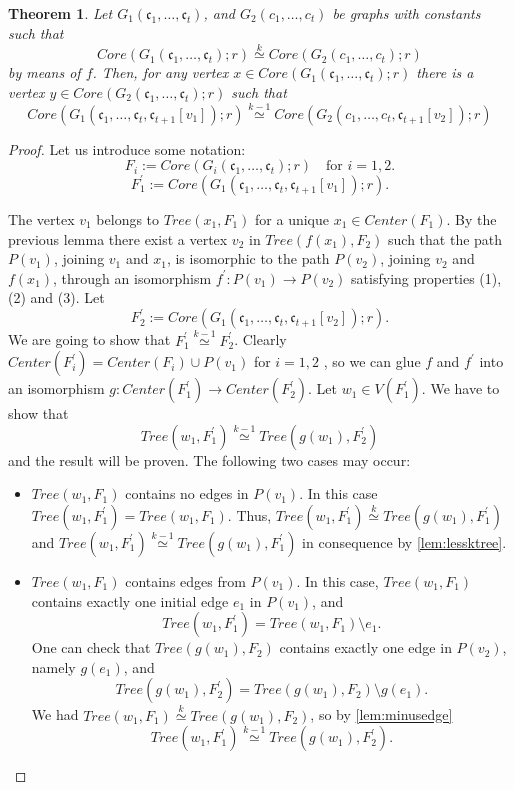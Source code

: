 \documentclass[11pt,notitlepage,a4paper]{article}
\newtheorem{theorem}{Theorem}[section]
\theoremstyle{definition}
\newcommand{\cc}{\mathfrak{c}}
\newcommand{\morph}[1]{\stackrel{#1}{\simeq}}
\begin{document}
\begin{theorem} \label{thm:chooseconstant}
	Let $G_1(\cc_1,\dots, \cc_t)$, and $G_2(c_1,\dots,c_t)$ be graphs
	with constants such that 
	\[ Core(G_1(\cc_1,\dots, \cc_t);r)\morph{k} Core(G_2(c_1,\dots,c_t);r)\]
	by means of $f$. 
	Then, for any vertex $x\in Core(G_1(\cc_1,\dots, \cc_t);r)$ there is a vertex
	$y\in Core(G_2(\cc_1,\dots, \cc_t);r)$ such that 
	\[Core(G_1(\cc_1,\dots, \cc_t,\cc_{t+1}[v_1]);r)\morph{k-1} Core(G_2(c_1,\dots,c_t,\cc_{t+1}[v_2]);r)\]
\end{theorem}
\begin{proof}
	Let us introduce some notation:
	\[F_i:=Core(G_i(\cc_1,\dots, \cc_t);r)\quad \text{for }i=1,2. \]
	\[F^\prime_1:=Core(G_1(\cc_1,\dots, \cc_t,\cc_{t+1}[v_1]);r).\]
	
	The vertex $v_1$ belongs to $Tree(x_1,F_1)$
	for a unique $x_1\in Center(F_1)$. By the previous lemma there exist a vertex $v_2$ in 
	$Tree(f(x_1),F_2)$ such that the path $P(v_1)$, 
	joining $v_1$ and $x_1$, is isomorphic to the path
	$P(v_2)$, joining $v_2$ and $f(x_1)$, through an isomorphism $f^\prime: P(v_1)
	\rightarrow P(v_2)$ satisfying properties (1), (2) and (3). 
	Let 
	\[F^\prime_2:=Core(G_1(\cc_1,\dots, \cc_t,\cc_{t+1}[v_2]);r).\]
	We are going to show that $F^\prime_1\morph{k-1}F^\prime_2$.
	Clearly $Center(F^\prime_i)=Center(F_i)\cup P(v_1)$ for $i=1,2$ , so we can glue
	$f$ and $f^\prime$ into an isomorphism $g:Center(F^\prime_1)\rightarrow Center(F^\prime_2)$.
	Let $w_1\in V(F^\prime_1)$. We have to show that 
	\[Tree(w_1, F^\prime_1)\morph{k-1} Tree(g(w_1), F^\prime_2)\]
	and the result will be proven. The following two cases may occur:
	\begin{itemize}[leftmargin=*]
		\item $Tree(w_1,F_1)$ contains no edges in $P(v_1)$. 
		In this case $Tree(w_1,F^\prime_1)=Tree(w_1,F_1)$.
		Thus, $Tree(w_1,F^\prime_1)\morph{k} Tree(g(w_1),F^\prime_1)$
		and $Tree(w_1,F^\prime_1)\morph{k-1} Tree(g(w_1),F^\prime_1)$
		in consequence by \cref{lem:lessktree}.
		\item $Tree(w_1,F_1)$ contains edges from $P(v_1)$.
		In this case, $Tree(w_1,F_1)$ contains exactly one initial edge
		$e_1$ in $P(v_1)$, and 
		\[Tree(w_1,F^\prime_1)=Tree(w_1,F_1)\setminus e_1. \]
		One can check that $Tree(g(w_1),F_2)$ contains exactly one edge
		in $P(v_2)$, namely $g(e_1)$, and 
		\[Tree(g(w_1),F^\prime_2)=Tree(g(w_1),F_2)\setminus g(e_1).\]
		We had $Tree(w_1,F_1)\morph{k}Tree(g(w_1),F_2)$, so by
		\cref{lem:minusedge}
		\[Tree(w_1,F^\prime_1)\morph{k-1}Tree(g(w_1),F^\prime_2).\]
	\end{itemize}
\end{proof}
\end{document}
